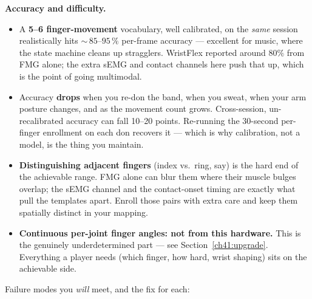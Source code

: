 \begin{trapbox}
\textbf{Accuracy and difficulty.}
\begin{itemize}
  \item A \textbf{5--6 finger-movement} vocabulary, well calibrated, on the
        \emph{same} session realistically hits $\sim$\,$85$--$95\,\%$ per-frame
        accuracy --- excellent for music, where the state machine cleans up
        stragglers. WristFlex reported around $80\%$ from FMG alone; the extra
        sEMG and contact channels here push that up, which is the point of going
        multimodal.
  \item Accuracy \textbf{drops} when you re-don the band, when you sweat, when
        your arm posture changes, and as the movement count grows. Cross-session,
        un-recalibrated accuracy can fall 10--20 points. Re-running the 30-second
        per-finger enrollment on each don recovers it --- which is why
        calibration, not a model, is the thing you maintain.
  \item \textbf{Distinguishing adjacent fingers} (index vs.\ ring, say) is the
        hard end of the achievable range. FMG alone can blur them where their
        muscle bulges overlap; the sEMG channel and the contact-onset timing are
        exactly what pull the templates apart. Enroll those pairs with extra care
        and keep them spatially distinct in your mapping.
  \item \textbf{Continuous per-joint finger angles: not from this hardware.} This
        is the genuinely underdetermined part --- see
        Section~\ref{ch41:upgrade}. Everything a player needs (which finger,
        how hard, wrist shaping) sits on the achievable side.
\end{itemize}
\end{trapbox}

Failure modes you \emph{will} meet, and the fix for each:

